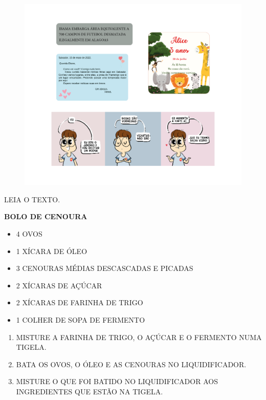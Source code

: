 \begin{figure}[H]
\centering
\includegraphics[width=\textwidth]{media/image141a152.png}
\end{figure}


LEIA O TEXTO.

\begin{myquote}
\textbf{BOLO DE CENOURA}


\begin{itemize}
\item 4 OVOS
\item 1 XÍCARA DE ÓLEO
\item 3 CENOURAS MÉDIAS DESCASCADAS E PICADAS
\item 2 XÍCARAS DE AÇÚCAR
\item 2 XÍCARAS DE FARINHA DE TRIGO
\item 1 COLHER DE SOPA DE FERMENTO
\end{itemize}

\begin{enumerate}
\item
  MISTURE A FARINHA DE TRIGO, O AÇÚCAR E O FERMENTO NUMA TIGELA.
\item
  BATA OS OVOS, O ÓLEO E AS CENOURAS NO LIQUIDIFICADOR.
\item
  MISTURE O QUE FOI BATIDO NO LIQUIDIFICADOR AOS INGREDIENTES QUE ESTÃO NA TIGELA.
\end{enumerate}
\end{myquote}


